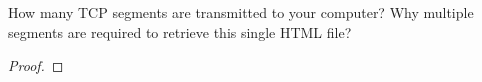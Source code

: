 \documentclass[../../main.tex]{subfiles}
\begin{document}
\begin{wts}
How many TCP segments are transmitted to your computer? Why multiple segments are required to retrieve this single HTML file? 
\end{wts}
\begin{proof}

\end{proof}
\end{document}
